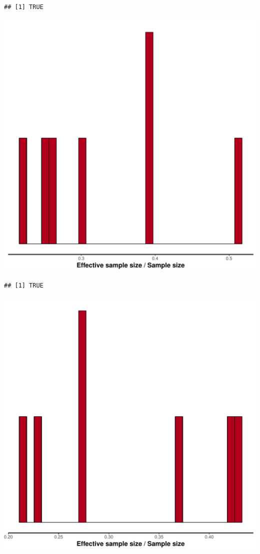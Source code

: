 \documentclass{article}\usepackage[]{graphicx}\usepackage[]{color}
\makeatletter
\def\maxwidth{ %
  \ifdim\Gin@nat@width>\linewidth
    \linewidth
  \else
    \Gin@nat@width
  \fi
}
\newenvironment{kframe}{%
 \def\at@end@of@kframe{}%
 \ifinner\ifhmode%
  \def\at@end@of@kframe{\end{minipage}}%
  \begin{minipage}{\columnwidth}%
 \fi\fi%
 \def\FrameCommand##1{\hskip\@totalleftmargin \hskip-\fboxsep
 \colorbox{shadecolor}{##1}\hskip-\fboxsep
     \hskip-\linewidth \hskip-\@totalleftmargin \hskip\columnwidth}%
 \MakeFramed {\advance\hsize-\width
   \@totalleftmargin\z@ \linewidth\hsize
   \@setminipage}}%
 {\par\unskip\endMakeFramed%
 \at@end@of@kframe}
\newenvironment{knitrout}{}{} %
\makeatother
\begin{document}
\begin{knitrout}
\color{fgcolor}\begin{kframe}
\begin{verbatim}
## [1] TRUE
\end{verbatim}
\end{kframe}
\includegraphics[width=\maxwidth]{figure/unnamed-chunk-14-1} 
\begin{kframe}\begin{verbatim}
## [1] TRUE
\end{verbatim}
\end{kframe}
\includegraphics[width=\maxwidth]{figure/unnamed-chunk-14-2} 

\end{knitrout}
\end{document}
